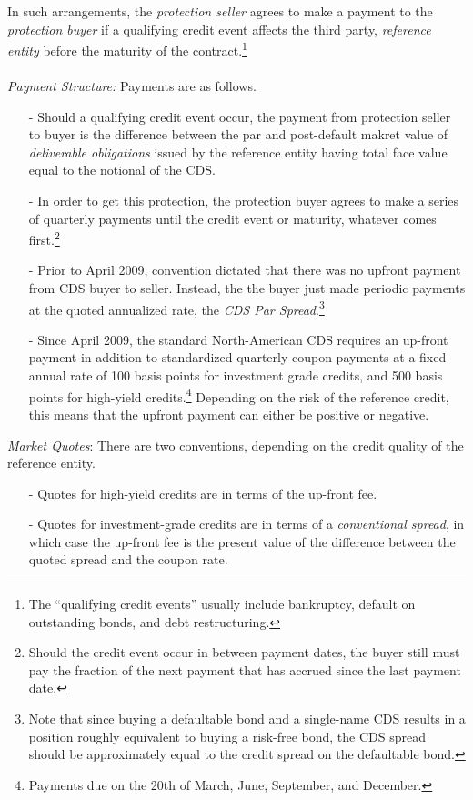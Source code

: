 \documentclass[a4paper,12pt]{scrartcl}
\begin{document}
In such arrangements, the \emph{protection seller}
agrees to make a payment to the \emph{protection buyer} if a
qualifying credit event affects the third party, \emph{reference entity}
before the maturity of the contract.\footnote{The 
``qualifying credit events'' usually include bankruptcy, default on 
outstanding bonds, and debt restructuring.} 
\\
\\
{\sl Payment Structure:} Payments are as follows.
\begin{itemize}
   \item[-] Should a qualifying credit event occur, the payment
      from protection seller to buyer is the difference between the
      par and post-default makret value of \emph{deliverable obligations}
      issued by the reference entity having total face value equal to
      the notional of the CDS.
   \item[-] In order to get this protection, the protection buyer agrees
      to make a series of quarterly payments until the credit event
      or maturity, whatever comes first.\footnote{Should the credit
      event occur in between payment dates, the buyer still must
      pay the fraction of the next payment that has accrued since
      the last payment date.}
   \item[-] Prior to April 2009, convention dictated that there was
      no upfront payment from CDS buyer to seller. Instead, the
      the buyer just made periodic payments at the quoted annualized
      rate, the \emph{CDS Par Spread}.\footnote{Note that since buying 
      a defaultable bond and a single-name CDS results in a position 
      roughly equivalent to buying a risk-free bond, the CDS
      spread should be approximately equal to the credit spread on the
      defaultable bond.}
   \item[-] Since April 2009, the standard North-American CDS requires
      an up-front payment in addition to standardized quarterly
      coupon payments at a fixed annual rate of 100 basis points for 
      investment grade credits, and 500 basis points for high-yield
      credits.\footnote{Payments due on the 20th of March, June,
      September, and December.} Depending on the risk of the reference
      credit, this means that the upfront payment can either be 
      positive or negative.
\end{itemize}
\newpage
{\sl Market Quotes}: There are two conventions, depending on
the credit quality of the reference entity.
\begin{enumerate}
   \item[-] Quotes for high-yield credits are in terms of the 
      up-front fee.
   \item[-] Quotes for investment-grade credits are in terms of
      a \emph{conventional spread}, in which case the up-front fee
      is the present value of the difference between the quoted spread
      and the coupon rate.
\end{enumerate}
\end{document}
